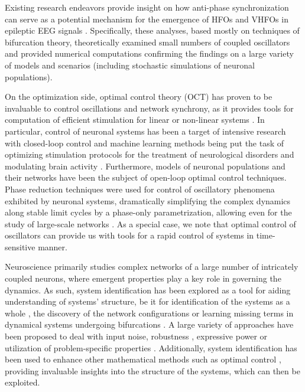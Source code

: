 \documentclass[a4paper,11pt]{scrartcl}
\begin{document}
Existing research endeavors provide insight on how anti-phase synchronization can serve as a potential mechanism for the emergence of HFOs and VHFOs in epileptic EEG signals \cite{Pribylova2024, Sevcik2024, Zathurecky2025}. Specifically, these analyses, based mostly on techniques of bifurcation theory, theoretically examined small numbers of coupled oscillators and provided numerical computations confirming the findings on a large variety of models and scenarios (including stochastic simulations of neuronal populations).

On the optimization side, optimal control theory (OCT) has proven to be invaluable to control oscillations and network synchrony, as it provides tools for computation of efficient stimulation for linear or non-linear systems \cite{Kirk2004}. In particular, control of neuronal systems has been a target of intensive research \cite{Kao2019, Suppa2016, Liu2018} with closed-loop control and machine learning methods being put the task of optimizing stimulation protocols for the treatment of neurological disorders \cite{Yu2020} and modulating brain activity \cite{Tafazoli2020, Park2019}. Furthermore, models of neuronal populations \cite{Salfenmoser2022, Salfenmoser2024} and their networks \cite{Chouzouris2021} have been the subject of open-loop optimal control techniques. Phase reduction \cite{Zlotnik2012, Dasanayake2011, Pietras2019} techniques were used for control of oscillatory phenomena exhibited by neuronal systems, dramatically simplifying the complex dynamics along stable limit cycles by a phase-only parametrization, allowing even for the study of large-scale networks \cite{Bomela2023}. As a special case, we note that optimal control of oscillators can provide us with tools for a rapid control of systems in time-sensitive manner.

Neuroscience primarily studies complex networks of a large number of intricately coupled neurons, where emergent properties play a key role in governing the dynamics. As such, system identification has been explored as a tool for aiding understanding of systems' structure, be it for identification of the systems as a whole \cite{Brunton2019, Prokop2024}, the discovery of the network configurations or learning missing terms in dynamical systems undergoing bifurcations \cite{VortmeyerKley2021}. A large variety of approaches have been proposed to deal with input noise, robustness \cite{Kaheman2020, Rosafalco2024}, expressive power or utilization of problem-specific properties \cite{Bisheban2017, Jongeneel2022}. Additionally, system identification has been used to enhance other mathematical methods such as optimal control \cite{Morrison2021}, providing invaluable insights into the structure of the systems, which can then be exploited.
\end{document}
